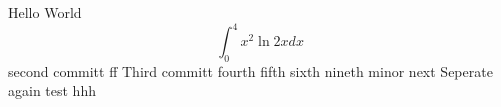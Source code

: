 \documentclass{article}
\begin{document}
Hello World
$$\int_0^4 x^2 \ln{2x}dx$$
second committ  ff
Third committ 
fourth
fifth
sixth
nineth
minor
next
Seperate
again
test
hhh
\end{document}
